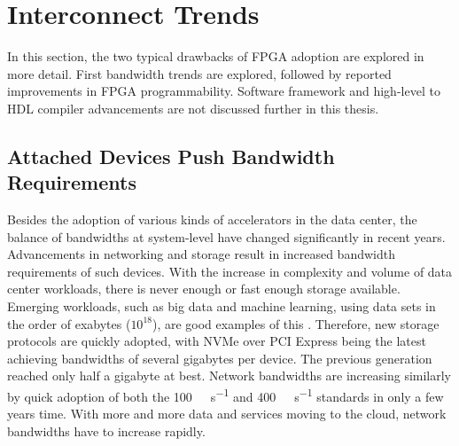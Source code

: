 




\section{Interconnect Trends}
In this section, the two typical drawbacks of FPGA adoption are explored in more detail. First bandwidth trends are explored, followed by reported improvements in FPGA programmability. Software framework and high-level to HDL compiler advancements are not discussed further in this thesis.



\subsection{Attached Devices Push Bandwidth Requirements}


Besides the adoption of various kinds of accelerators in the data center, the balance of bandwidths at system-level have changed significantly in recent years. Advancements in networking and storage result in increased bandwidth requirements of such devices. With the increase in complexity and volume of data center workloads, there is never enough or fast enough storage available.
Emerging workloads, such as big data and machine learning, using data sets in the order of exabytes ($10^{18}$), are good examples of this \cite{teradata}.
Therefore, new storage protocols are quickly adopted, with NVMe over PCI Express being the latest achieving bandwidths of several gigabytes per device. The previous generation reached only half a gigabyte at best. Network bandwidths are increasing similarly by quick adoption of both the \SI{100}{\giga\bit\per\second} and \SI{400}{\giga\bit\per\second} standards in only a few years time. With more and more data and services moving to the cloud, network bandwidths have to increase rapidly.



